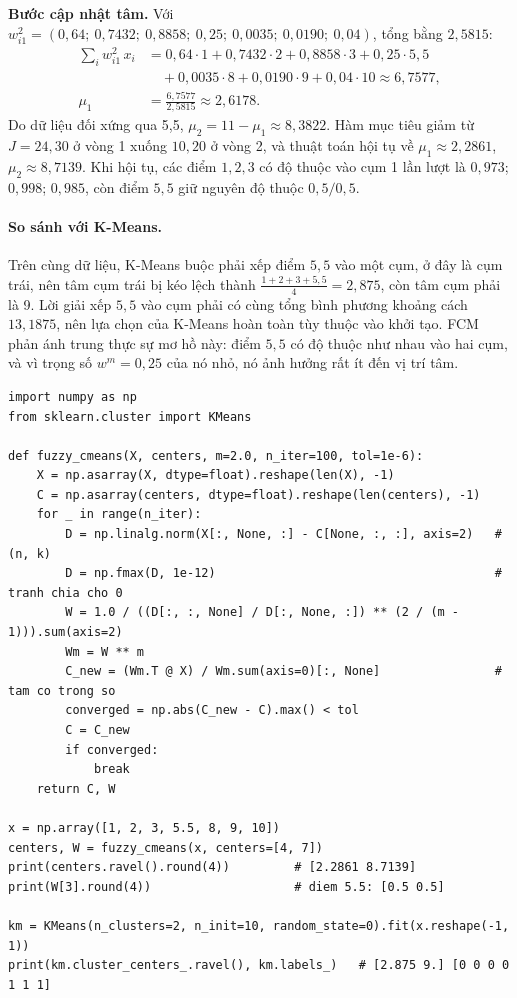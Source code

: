 \noindent\textbf{Bước cập nhật tâm.} Với $w_{i1}^2 = (0{,}64;\ 0{,}7432;\ 0{,}8858;\ 0{,}25;\ 0{,}0035;\ 0{,}0190;\ 0{,}04)$, tổng bằng $2{,}5815$:
\begin{align*}
    \textstyle\sum_i w_{i1}^2\,x_i &= 0{,}64 \cdot 1 + 0{,}7432 \cdot 2 + 0{,}8858 \cdot 3 + 0{,}25 \cdot 5{,}5 \\
    &\quad + 0{,}0035 \cdot 8 + 0{,}0190 \cdot 9 + 0{,}04 \cdot 10 \approx 6{,}7577, \\
    \mu_1 &= \frac{6{,}7577}{2{,}5815} \approx 2{,}6178 .
\end{align*}
Do dữ liệu đối xứng qua 5,5, $\mu_2 = 11 - \mu_1 \approx 8{,}3822$. Hàm mục tiêu giảm từ $J = 24{,}30$ ở vòng 1 xuống $10{,}20$ ở vòng 2, và thuật toán hội tụ về $\mu_1 \approx 2{,}2861$, $\mu_2 \approx 8{,}7139$. Khi hội tụ, các điểm $1, 2, 3$ có độ thuộc vào cụm 1 lần lượt là $0{,}973$; $0{,}998$; $0{,}985$, còn điểm $5{,}5$ giữ nguyên độ thuộc \textbf{$0{,}5 / 0{,}5$}.

\paragraph{So sánh với K-Means.} Trên cùng dữ liệu, K-Means buộc phải xếp điểm $5{,}5$ vào một cụm, ở đây là cụm trái, nên tâm cụm trái bị kéo lệch thành $\frac{1 + 2 + 3 + 5{,}5}{4} = 2{,}875$, còn tâm cụm phải là 9. Lời giải xếp $5{,}5$ vào cụm phải có cùng tổng bình phương khoảng cách $13{,}1875$, nên lựa chọn của K-Means hoàn toàn tùy thuộc vào khởi tạo. FCM phản ánh trung thực sự mơ hồ này: điểm $5{,}5$ có độ thuộc như nhau vào hai cụm, và vì trọng số $w^m = 0{,}25$ của nó nhỏ, nó ảnh hưởng rất ít đến vị trí tâm.

\begin{lstlisting}[caption={Cài đặt Fuzzy C-Means bằng NumPy và so sánh với K-Means}]
import numpy as np
from sklearn.cluster import KMeans

def fuzzy_cmeans(X, centers, m=2.0, n_iter=100, tol=1e-6):
    X = np.asarray(X, dtype=float).reshape(len(X), -1)
    C = np.asarray(centers, dtype=float).reshape(len(centers), -1)
    for _ in range(n_iter):
        D = np.linalg.norm(X[:, None, :] - C[None, :, :], axis=2)   # (n, k)
        D = np.fmax(D, 1e-12)                                       # tranh chia cho 0
        W = 1.0 / ((D[:, :, None] / D[:, None, :]) ** (2 / (m - 1))).sum(axis=2)
        Wm = W ** m
        C_new = (Wm.T @ X) / Wm.sum(axis=0)[:, None]                # tam co trong so
        converged = np.abs(C_new - C).max() < tol
        C = C_new
        if converged:
            break
    return C, W

x = np.array([1, 2, 3, 5.5, 8, 9, 10])
centers, W = fuzzy_cmeans(x, centers=[4, 7])
print(centers.ravel().round(4))         # [2.2861 8.7139]
print(W[3].round(4))                    # diem 5.5: [0.5 0.5]

km = KMeans(n_clusters=2, n_init=10, random_state=0).fit(x.reshape(-1, 1))
print(km.cluster_centers_.ravel(), km.labels_)   # [2.875 9.] [0 0 0 0 1 1 1]
\end{lstlisting}

